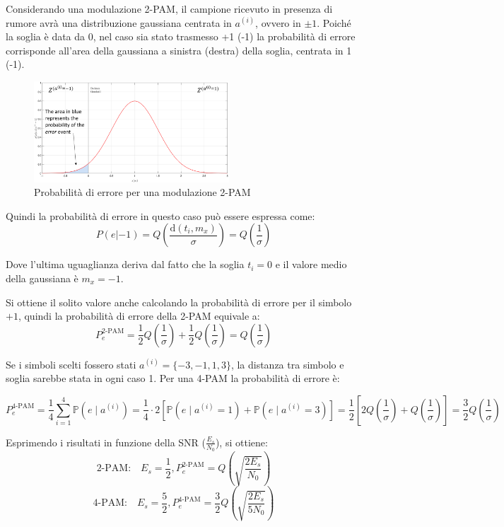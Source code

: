 Considerando una modulazione 2-PAM, il campione ricevuto in presenza di rumore avrà una distribuzione gaussiana centrata in $a^{(i)}$, ovvero in $\pm 1$. Poiché la soglia è data da 0, nel caso sia stato trasmesso +1 (-1) la probabilità di errore corrisponde all'area della gaussiana a sinistra (destra) della soglia, centrata in 1 (-1).

\begin{figure}[ht]
    \centering
    \includegraphics[width=0.65\textwidth]{imgs/2pamerror.jpg}
    \caption*{Probabilità di errore per una modulazione 2-PAM}
\end{figure}


Quindi la probabilità di errore in questo caso può essere espressa come:
\[
    P(e | -1) = Q\left(\frac{\text{d}(t_i, m_x)}{\sigma}\right) = Q\left(\frac{1}{\sigma}\right)
\]

Dove l'ultima uguaglianza deriva dal fatto che la soglia $t_i=0$ e il valore medio della gaussiana è $m_x = -1$.

Si ottiene il solito valore anche calcolando la probabilità di errore per il simbolo $+1$, quindi la probabilità di errore della 2-PAM equivale a:
\[
    P^{\text{2-PAM}}_e = \frac{1}{2} Q\left(\frac{1}{\sigma}\right) + \frac{1}{2} Q\left(\frac{1}{\sigma}\right) = Q\left(\frac{1}{\sigma}\right)
\]

Se i simboli scelti fossero stati $a^{(i)} = \{-3, -1, 1, 3\}$, la distanza tra simbolo e soglia sarebbe stata in ogni caso 1.
Per una 4-PAM la probabilità di errore è:

\[ 
    P^{\text{4-PAM}}_e = \frac{1}{4} \sum_{i=1}^{4} \mathbb{P}(e \mid a^{(i)}) = \frac{1}{4} \cdot 2 \left[ \mathbb{P}(e \mid a^{(i)} = 1) + \mathbb{P}(e \mid a^{(i)} = 3) \right] = \frac{1}{2} \left[ 2 Q\left( \frac{1}{\sigma} \right) + Q\left( \frac{1}{\sigma} \right) \right] = \frac{3}{2} Q\left( \frac{1}{\sigma} \right)
\]


Esprimendo i risultati in funzione della SNR ($\frac{E_s}{N_0}$), si ottiene:
\[
    \text{2-PAM:} \quad E_s = \frac{1}{2}, P^{\text{2-PAM}}_e = Q\left( \sqrt{\frac{2 E_s}{N_0}} \right)
\]
\[
    \text{4-PAM:} \quad E_s = \frac{5}{2}, P^{\text{4-PAM}}_e = \frac{3}{2} Q\left( \sqrt{\frac{2 E_s}{5 N_0}} \right)
\]




